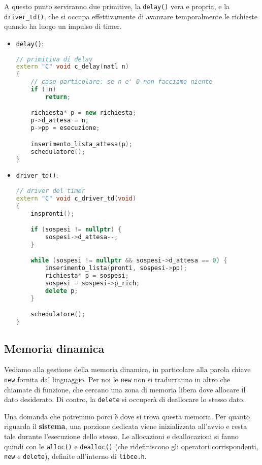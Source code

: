 \documentclass[a4paper,11pt]{article}
\begin{document}
A questo punto serviranno due primitive, la \lstinline|delay()| vera e propria, e la \lstinline|driver_td()|, che si occupa effettivamente di avanzare temporalmente le richieste quando ha luogo un impulso di timer.
\begin{itemize}
	\item \lstinline|delay()|:
\begin{lstlisting}[language=C++, style=codestyle]	
// primitiva di delay
extern "C" void c_delay(natl n)
{
	// caso particolare: se n e' 0 non facciamo niente
	if (!n)
		return;

	richiesta* p = new richiesta;
	p->d_attesa = n;
	p->pp = esecuzione;

	inserimento_lista_attesa(p);
	schedulatore();
}
\end{lstlisting}
	\item \lstinline|driver_td()|:
\begin{lstlisting}[language=C++, style=codestyle]	
// driver del timer
extern "C" void c_driver_td(void)
{
	inspronti();

	if (sospesi != nullptr) {
		sospesi->d_attesa--;
	}

	while (sospesi != nullptr && sospesi->d_attesa == 0) {
		inserimento_lista(pronti, sospesi->pp);
		richiesta* p = sospesi;
		sospesi = sospesi->p_rich;
		delete p;
	}

	schedulatore();
}
\end{lstlisting}
\end{itemize}

\subsection{Memoria dinamica}
\lstset{language=C++}
Vediamo alla gestione della memoria dinamica, in particolare alla parola chiave \lstinline|new| fornita dal linguaggio.
Per noi le \lstinline|new| non si tradurranno in altro che chiamate di funzione, che cercano una zona di memoria libera dove allocare il dato desiderato.
Di contro, la \lstinline|delete| si occuperà di deallocare lo stesso dato.

Una domanda che potremmo porci è dove si trova questa memoria.
Per quanto riguarda il \textbf{sistema}, una porzione dedicata viene inizializzata all'avvio e resta tale durante l'esecuzione dello stesso.
Le allocazioni e deallocazioni si fanno quindi con le \lstinline|alloc()| e \lstinline|dealloc()| (che ridefiniscono gli operatori corrispondenti, \lstinline|new| e \lstinline|delete|), definite all'interno di \lstinline|libce.h|.
\end{document}
